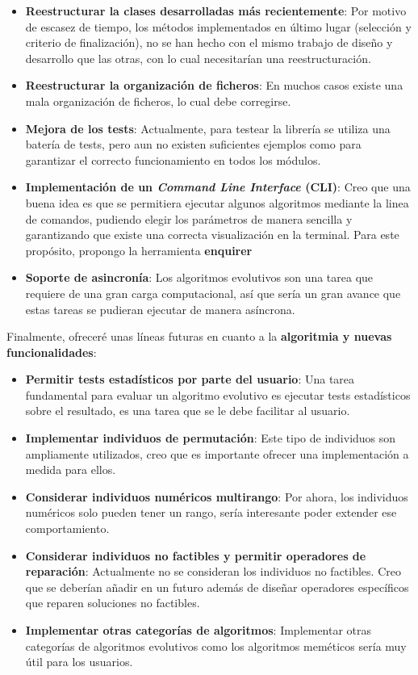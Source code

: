 \begin{itemize}
    \item \textbf{Reestructurar la clases desarrolladas más recientemente}: Por motivo de escasez de tiempo, los métodos implementados en último lugar (selección y criterio de finalización), no se han hecho con el mismo trabajo de diseño y desarrollo que las otras, con lo cual necesitarían una reestructuración.
    \item \textbf{Reestructurar la organización de ficheros}: En muchos casos existe una mala organización de ficheros, lo cual debe corregirse.
    \item \textbf{Mejora de los tests}: Actualmente, para testear la librería se utiliza una batería de tests, pero aun no existen suficientes ejemplos como para garantizar el correcto funcionamiento en todos los módulos.
    \item \textbf{Implementación de un \textit{Command Line Interface} (CLI)}: Creo que una buena idea es que se permitiera ejecutar algunos algoritmos mediante la linea de comandos, pudiendo elegir los parámetros de manera sencilla y garantizando que existe una correcta visualización en la terminal. Para este propósito, propongo la herramienta \textbf{enquirer}
    \item \textbf{Soporte de asincronía}: Los algoritmos evolutivos son una tarea que requiere de una gran carga computacional, así que sería un gran avance que estas tareas se pudieran ejecutar de manera asíncrona.
\end{itemize}

Finalmente, ofreceré unas líneas futuras en cuanto a la \textbf{algoritmia y nuevas funcionalidades}:

\begin{itemize}
    \item \textbf{Permitir tests estadísticos por parte del usuario}: Una tarea fundamental para evaluar un algoritmo evolutivo es ejecutar tests estadísticos sobre el resultado, es una tarea que se le debe facilitar al usuario.
    \item \textbf{Implementar individuos de permutación}: Este tipo de individuos son ampliamente utilizados, creo que es importante ofrecer una implementación a medida para ellos.
    \item \textbf{Considerar individuos numéricos multirango}: Por ahora, los individuos numéricos solo pueden tener un rango, sería interesante poder extender ese comportamiento.
    \item \textbf{Considerar individuos no factibles y permitir operadores de reparación}: Actualmente no se consideran los individuos no factibles. Creo que se deberían añadir en un futuro además de diseñar operadores específicos que reparen soluciones no factibles.
    \item \textbf{Implementar otras categorías de algoritmos}: Implementar otras categorías de algoritmos evolutivos como los algoritmos meméticos sería muy útil para los usuarios.
\end{itemize}
